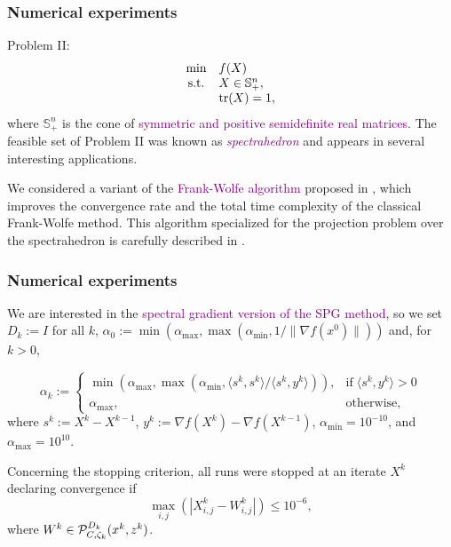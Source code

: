 \begin{frame}[t]\frametitle{Numerical experiments}
	\begin{block}{Problem II:}
		\begin{equation*}
			\begin{array}{cl}
				\displaystyle\min & f(X)                  \\
				\mbox{s.t.}       & X \in \mathbb{S}^n_+, \\
				                  & \textrm{tr}(X)=1,
			\end{array}
		\end{equation*}
		where $\mathbb{S}^n_+$ is the cone of \textcolor{purple}{symmetric and positive semidefinite real matrices}. The feasible set of Problem II was known as \textcolor{purple}{{\it spectrahedron}} and appears in several interesting applications.
	\end{block}

	We considered a variant of the \textcolor{purple}{Frank-Wolfe algorithm} proposed in \cite{allen2017linear}, which improves the convergence rate and the total time complexity of the classical Frank-Wolfe method. This algorithm specialized for the projection problem over the spectrahedron is carefully described in \cite{aguiar2021inexact}.
\end{frame}


\begin{frame}[t]\frametitle{Numerical experiments}

	We are interested in the \textcolor{purple}{spectral gradient version of the SPG method}, so we set $D_k:=I$ for all $k$, $\alpha_0 := \min(\alpha_{\max}, \max(\alpha_{\min}, 1/ \| \nabla f(x^0) \|))$ and, for $k>0$,

	\begin{equation}
		\alpha_k:=\left\{
		\begin{array}{ll}
			\displaystyle\min (\alpha_{\max},\max (\alpha_{\min},\langle s^k,s^k\rangle/\langle s^k,y^k\rangle)), & \mbox{if} \; \langle s^k,y^k\rangle > 0 \\
			\alpha_{\max},                                                                                        & \mbox{otherwise},
		\end{array}\right.
	\end{equation}
	where $s^k:=X^k - X^{k-1}$, $y^k:=\nabla f(X^k) - \nabla f(X^{k-1})$, $\alpha_{\min}=10^{-10}$, and $\alpha_{\max}=10^{10}$.


	Concerning the stopping criterion, all runs were stopped at an iterate $X^k$ declaring convergence if
	$$
		\displaystyle \max_{i,j} (|X^k_{i,j}-W^k_{i,j}| )\leq 10^{-6},
	$$
	where $W^k \in {\cal P}_{C, \zeta_k}^{D_k}(x^{k}, z^k)$.
\end{frame}


